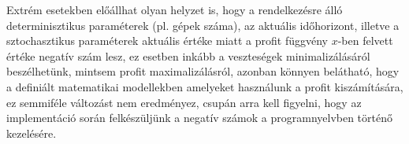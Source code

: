 Extrém esetekben előállhat olyan helyzet is, hogy a rendelkezésre álló determinisztikus paraméterek (pl. gépek száma), az aktuális időhorizont, illetve a sztochasztikus paraméterek aktuális értéke miatt a profit függvény $x$-ben felvett értéke negatív szám lesz, ez esetben inkább a veszteségek minimalizálásáról beszélhetünk, mintsem profit maximalizálásról, azonban könnyen belátható, hogy a definiált matematikai modellekben amelyeket használunk a profit kiszámítására, ez semmiféle változást nem eredményez, csupán arra kell figyelni, hogy az implementáció során felkészüljünk a negatív számok a programnyelvben történő kezelésére.